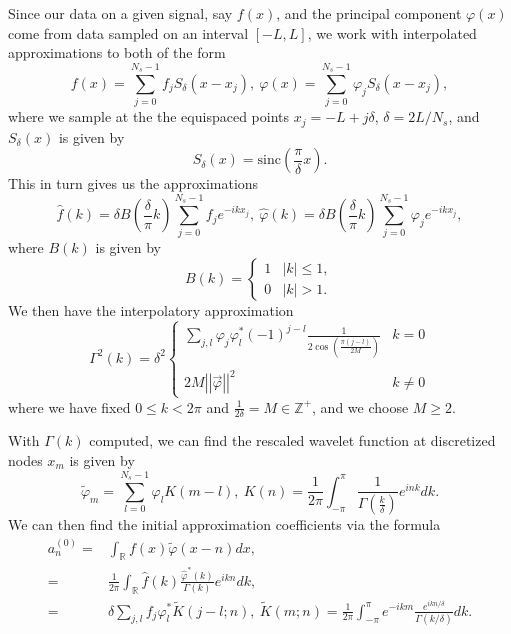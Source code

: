 \documentclass[a4paper,11pt]{article}
\newcommand{\ba}{\begin{array}}
\newcommand{\ea}{\end{array}}
\newcommand{\gnorm}[1]{\left|\left| #1\right|\right|}
\begin{document}
Since our data on a given signal, say $f(x)$, and the principal component $\varphi(x)$ come from data sampled on an interval $[-L,L]$, we work with interpolated approximations to both of the form
\[
f(x) = \sum_{j=0}^{N_{s}-1}f_{j}S_{\delta}(x-x_{j}), ~ \varphi(x) = \sum_{j=0}^{N_{s}-1} \varphi_{j}S_{\delta}(x-x_{j}), 
\]
where we sample at the the equispaced points $x_{j} = -L+j\delta $, $\delta = 2L/N_{s}$, and $S_{\delta }(x)$ is given by 
\[
S_{\delta}(x) = \mbox{sinc}\left(\frac{\pi}{\delta} x\right).
\]
This in turn gives us the approximations 
\[
\hat{f}(k) = \delta B\left(\frac{\delta}{\pi} k\right)\sum_{j=0}^{N_{s}-1}f_{j}e^{-ikx_{j}}, ~ \hat{\varphi}(k) = \delta B\left(\frac{\delta}{\pi} k\right)\sum_{j=0}^{N_{s}-1}\varphi_{j}e^{-ikx_{j}},
\]
where $B(k)$ is given by 
\[
B(k) = \left\{
\ba{rl}
1 & |k| \leq 1, \\ 
0 & |k| > 1.
\ea
\right.
\]
We then have the interpolatory approximation
\[
\Gamma^{2}(k) = \delta^{2}\left\{\ba{rl}
\sum_{j,l}\varphi_{j}\varphi^{\ast}_{l}(-1)^{j-l}\frac{1}{2\cos\left(\frac{\pi(j-l)}{2M}\right)} & k = 0\\
&\\
2M\gnorm{\vec{\varphi}}^{2}  & k \neq 0
\ea
\right.
\]
where we have fixed $0\leq k < 2\pi$ and $\frac{1}{2\delta} = M \in \mathbb{Z}^{+}$, and we choose $M \geq 2$.


With $\Gamma(k)$ computed, we can find the rescaled wavelet function at discretized nodes $x_{m}$ is given by 
\[
\tilde{\varphi}_{m} = \sum_{l=0}^{N_{s}-1}\varphi_{l}K(m-l), ~ K(n) = \frac{1}{2\pi}\int_{-\pi}^{\pi} \frac{1}{\Gamma\left(\frac{k}{\delta}\right)}e^{ink}dk.
\]
We can then find the initial approximation coefficients via the formula
\begin{align*}
a^{(0)}_{n} = & \int_{\mathbb{R}}f(x)\tilde{\varphi}(x-n)dx, \\
= & \frac{1}{2\pi}\int_{\mathbb{R}}\hat{f}(k)\frac{\hat{\varphi}^{\ast}(k)}{\Gamma(k)}e^{ikn}dk,\\
= & \delta \sum_{j,l}f_{j}\varphi^{\ast}_{l}\tilde{K}(j-l;n), ~ \tilde{K}(m;n) = \frac{1}{2\pi}\int_{-\pi}^{\pi}e^{-ikm} \frac{e^{ikn/\delta}}{\Gamma(k/\delta)}dk.
\end{align*}
\end{document}
